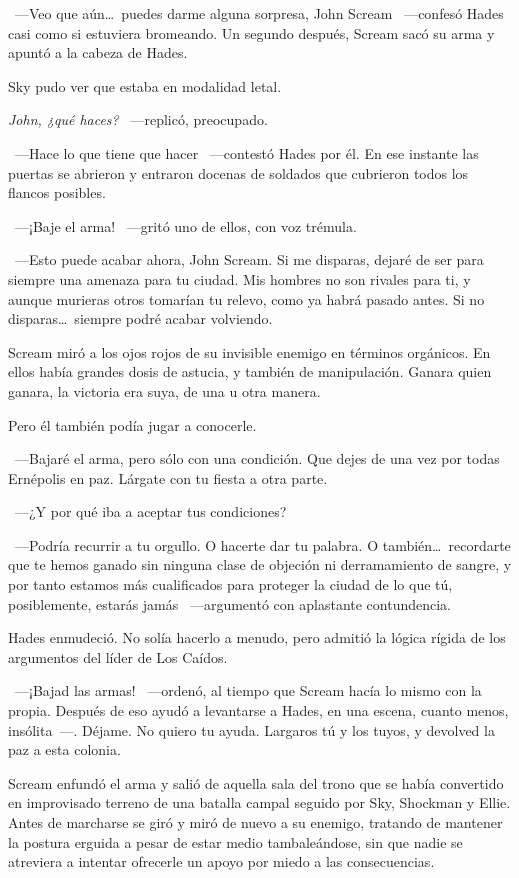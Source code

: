 ~---Veo que aún\dots\ puedes darme alguna sorpresa, John Scream ~---confesó Hades casi como si estuviera bromeando. Un segundo después, Scream sacó su arma y apuntó a la cabeza de Hades.

Sky pudo ver que estaba en modalidad letal.

\emph{John, ¿qué haces?} ~---replicó, preocupado.

~---Hace lo que tiene que hacer ~---contestó Hades por él. En ese instante las puertas se abrieron y entraron docenas de soldados que cubrieron todos los flancos posibles.

~---¡Baje el arma! ~---gritó uno de ellos, con voz trémula.

~---Esto puede acabar ahora, John Scream. Si me disparas, dejaré de ser para siempre una amenaza para tu ciudad. Mis hombres no son rivales para ti, y aunque murieras otros tomarían tu relevo, como ya habrá pasado antes. Si no disparas\dots\ siempre podré acabar volviendo.

Scream miró a los ojos rojos de su invisible enemigo en términos orgánicos. En ellos había grandes dosis de astucia, y también de manipulación. Ganara quien ganara, la victoria era suya, de una u otra manera.

Pero él también podía jugar a conocerle.

~---Bajaré el arma, pero sólo con una condición. Que dejes de una vez por todas Ernépolis en paz. Lárgate con tu fiesta a otra parte.

~---¿Y por qué iba a aceptar tus condiciones?

~---Podría recurrir a tu orgullo. O hacerte dar tu palabra. O también\dots\ recordarte que te hemos ganado sin ninguna clase de objeción ni derramamiento de sangre, y por tanto estamos más cualificados para proteger la ciudad de lo que tú, posiblemente, estarás jamás ~---argumentó con aplastante contundencia.

Hades enmudeció. No solía hacerlo a menudo, pero admitió la lógica rígida de los argumentos del líder de Los Caídos.

~---¡Bajad las armas! ~---ordenó, al tiempo que Scream hacía lo mismo con la propia. Después de eso ayudó a levantarse a Hades, en una escena, cuanto menos, insólita~---. Déjame. No quiero tu ayuda. Largaros tú y los tuyos, y devolved la paz a esta colonia.

Scream enfundó el arma y salió de aquella sala del trono que se había convertido en improvisado terreno de una batalla campal seguido por Sky, Shockman y Ellie. Antes de marcharse se giró y miró de nuevo a su enemigo, tratando de mantener la postura erguida a pesar de estar medio tambaleándose, sin que nadie se atreviera a intentar ofrecerle un apoyo por miedo a las consecuencias.

